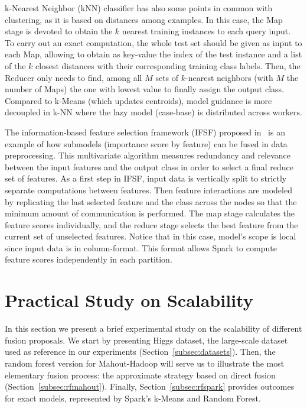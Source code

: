 \documentclass[3p,review]{elsarticle}
\begin{document}
k-Nearest Neighbor (kNN) classifier \cite{MailloRTH17-kNN} has also some points in common with clustering, as it is based on distances among examples. In this case, the Map stage is devoted to obtain the $k$ nearest training instances to each query input. To carry out an exact computation, the whole test set should be given as input to each Map, allowing to obtain as key-value the index of the test instance and a list of the $k$ closest distances with their corresponding training class labels. Then, the Reducer only needs to find, among all $M$ sets of $k$-nearest neighbors (with $M$ the number of Maps) the one with lowest value to finally assign the output class. Compared to k-Means (which updates centroids), model guidance is more decoupled in k-NN where the lazy model (case-base) is distributed across workers.

The information-based feature selection framework (IFSF) proposed in~\cite{Ramirez-Gallego17-mrmr} is an example of how submodels (importance score by feature) can be fused in data preprocessing. This multivariate algorithm measures redundancy and relevance between the input features and the output class in order to select a final reduce set of features. As a first step in IFSF, input data is vertically split to strictly separate computations between features. Then feature interactions are modeled by replicating the last selected feature and the class across the nodes so that the minimum amount of communication is performed. The map stage calculates the feature scores individually, and the reduce stage selects the best feature from the current set of unselected features. Notice that in this case, model's scope is local since input data is in column-format. This format allows Spark to compute feature scores independently in each partition.



\section{Practical Study on Scalability}\label{sec:exp}

In this section we present a brief experimental study on the scalability of different fusion proposals. We start by presenting Higgs dataset, the large-scale dataset used as reference in our experiments (Section~\ref{subsec:datasets}). Then, the random forest version for Mahout-Hadoop will serve us to illustrate the most elementary fusion process: the approximate strategy based on direct fusion (Section~\ref{subsec:rfmahout}). Finally, Section~\ref{subsec:rfspark} provides outcomes for exact models, represented by Spark's k-Means and Random Forest.
\end{document}
